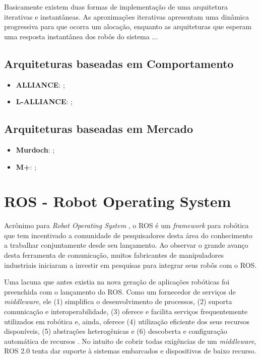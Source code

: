             Basicamente existem duas formas de implementação de uma arquitetura iterativas e instantâneas. As aproximações iterativas apresentam uma dinâmica progressiva para que ocorra um alocação, enquanto as arquiteturas que esperam uma resposta instantânea dos robôs do sistema ...
        
            \subsection{Arquiteturas baseadas em Comportamento} \label{subsec:arch_comportamento}
            
            \begin{itemize}
                \item \textbf{ALLIANCE}: \cite{ref:parker1998alliance};
                \item \textbf{L-ALLIANCE}: \cite{ref:parker1996lalliance};
                
            \end{itemize}
            
            \subsection{Arquiteturas baseadas em Mercado} \label{subsec:arch_mercado}
    
            \begin{itemize}
                \item \textbf{Murdoch}: \cite{ref:gerkey2002murdoch};
                \item \textbf{M+}: \cite{ref:botelho1999m+};
                
            \end{itemize}
                
    \section{ROS - Robot Operating System} \label{sec:ros}
        Acrônimo para \textit{Robot Operating System} \cite{ref:quigley2009ros}, o ROS é um \textit{framework} para robótica que tem incentivado a comunidade de pesquisadores desta área do conhecimento a trabalhar conjuntamente desde seu lançamento. Ao observar o grande avanço desta ferramenta de comunicação, muitos fabricantes de manipuladores industriais iniciaram a investir em pesquisas para integrar seus robôs com o ROS. 
        
        Uma lacuna que antes existia na nova geração de aplicações robóticas foi preenchida com o lançamento do ROS. Como um fornecedor de serviços de \textit{middleware}, ele (1) simplifica o desenvolvimento de processos, (2) suporta comunicação e interoperabilidade, (3) oferece e facilita serviços frequentemente utilizados em robótica e, ainda, oferece (4) utilização eficiente dos seus recursos disponíveis, (5) abstrações heterogênicas e (6) descoberta e configuração automática de recursos \cite{ref:quigley2009ros}. No intuito de cobrir todas exigências de um \textit{middleware}, ROS 2.0 tenta dar suporte à sistemas embarcados e dispositivos de baixo recurso.
    
